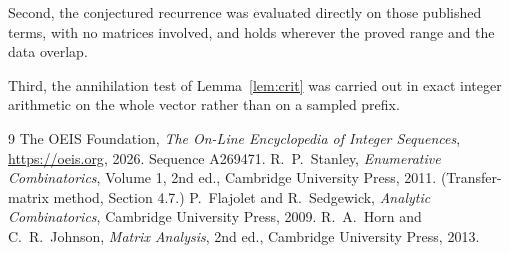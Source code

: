 \documentclass[11pt,a4paper]{article}
\theoremstyle{plain}
\theoremstyle{definition}
\begin{document}
Second, the conjectured recurrence was evaluated directly on those published terms, with no
matrices involved, and holds wherever the proved range and the data overlap.

Third, the annihilation test of Lemma~\ref{lem:crit} was carried out in exact integer
arithmetic on the whole vector rather than on a sampled prefix.

\begin{thebibliography}{9}
 The OEIS Foundation, \emph{The On-Line Encyclopedia of Integer
Sequences}, \url{https://oeis.org}, 2026. Sequence A269471.
 R.~P.~Stanley, \emph{Enumerative Combinatorics}, Volume 1, 2nd ed.,
Cambridge University Press, 2011. (Transfer-matrix method, Section 4.7.)
 P.~Flajolet and R.~Sedgewick, \emph{Analytic Combinatorics}, Cambridge
University Press, 2009.
 R.~A.~Horn and C.~R.~Johnson, \emph{Matrix Analysis}, 2nd ed., Cambridge
University Press, 2013.
\end{thebibliography}
\end{document}
